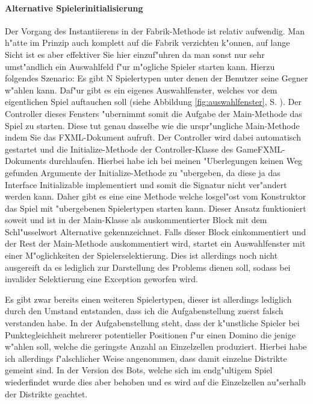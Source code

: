 \paragraph{Alternative Spielerinitialisierung}
\label{par:alternativeSpielerinitialisierung}
Der Vorgang des Instantiierens in der Fabrik-Methode ist relativ aufwendig. Man h"atte im Prinzip auch komplett auf die Fabrik verzichten k"onnen, auf lange Sicht ist es aber effektiver Sie hier einzuf"uhren da man sonst nur sehr umst"andlich ein Auswahlfeld f"ur m"ogliche Spieler starten kann. Hierzu folgendes Szenario: Es gibt N Spielertypen unter denen der Benutzer seine Gegner w"ahlen kann. Daf"ur gibt es ein eigenes Auswahlfenster, welches vor dem eigentlichen Spiel auftauchen soll (siehe Abbildung \ref{fig:auswahlfenster}, S. \pageref{fig:auswahlfenster}). Der Controller dieses Fensters "ubernimmt somit die Aufgabe der Main-Methode das Spiel zu starten. Diese tut genau dasselbe wie die urspr"ungliche Main-Methode indem Sie das FXML-Dokument aufruft. Der Controller wird dabei automatisch gestartet und die Initialize-Methode der Controller-Klasse des GameFXML-Dokuments durchlaufen. Hierbei habe ich bei meinen "Uberlegungen keinen Weg gefunden Argumente der Initialize-Methode zu "ubergeben, da diese ja das Interface Initializable implementiert und somit die Signatur nicht ver"andert werden kann. Daher gibt es eine eine Methode welche losgel"ost vom Konstruktor das Spiel mit "ubergebenen Spielertypen starten kann. Dieser Ansatz funktioniert soweit und ist in der Main-Klasse als auskommentierter Block mit dem Schl"usselwort \glqq Alternative\grqq {} gekennzeichnet. Falls dieser Block einkommentiert und der Rest der Main-Methode auskommentiert wird, startet ein Auswahlfenster mit einer M"oglichkeiten der Spielerselektierung. Dies ist allerdings noch nicht ausgereift da es lediglich zur Darstellung des Problems dienen soll, sodass bei invalider Selektierung eine Exception geworfen wird. 

Es gibt zwar bereits einen weiteren Spielertypen, dieser ist allerdings lediglich durch den Umstand entstanden, dass ich die Aufgabenstellung zuerst falsch verstanden habe. In der Aufgabenstellung steht, dass der k"unstliche Spieler bei Punktegleichheit mehrerer potentieller Positionen f"ur einen Domino die jenige w"ahlen soll, welche die geringste Anzahl an Einzelzellen produziert. Hierbei habe ich allerdings f"alschlicher Weise angenommen, dass damit einzelne Distrikte gemeint sind. In der Version des Bots, welche sich im endg"ultigem Spiel wiederfindet wurde dies aber behoben und es wird auf die Einzelzellen au"serhalb der Distrikte geachtet. 

